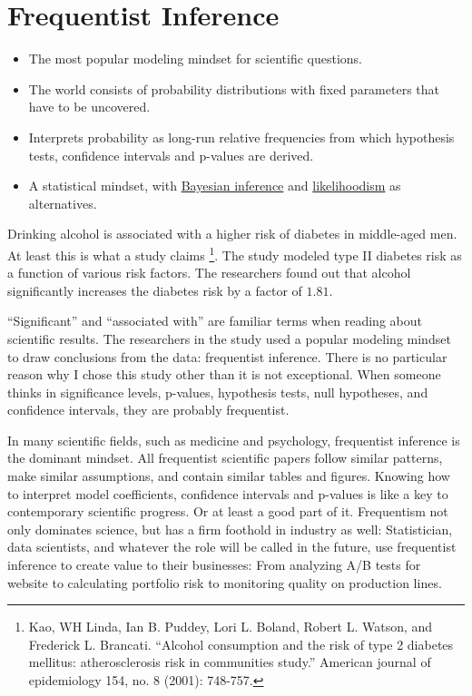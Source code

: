 \documentclass[
  10pt,
]{scrbook}
\providecommand{\tightlist}{%
  \setlength{\itemsep}{0pt}\setlength{\parskip}{0pt}}
\begin{document}
\hypertarget{statistical-inference}{%
\chapter{Frequentist Inference}\label{statistical-inference}}

\begin{itemize}
\tightlist
\item
  The most popular modeling mindset for scientific questions.
\item
  The world consists of probability distributions with fixed parameters that have to be uncovered.
\item
  Interprets probability as long-run relative frequencies from which hypothesis tests, confidence intervals and p-values are derived.
\item
  A statistical mindset, with \protect\hyperlink{bayesian}{Bayesian inference} and \protect\hyperlink{likelihoodism}{likelihoodism} as alternatives.
\end{itemize}

Drinking alcohol is associated with a higher risk of diabetes in middle-aged men.
At least this is what a study claims \footnote{Kao, WH Linda, Ian B. Puddey, Lori L. Boland, Robert L. Watson, and Frederick L. Brancati. ``Alcohol consumption and the risk of type 2 diabetes mellitus: atherosclerosis risk in communities study.'' American journal of epidemiology 154, no. 8 (2001): 748-757.}.
The study modeled type II diabetes risk as a function of various risk factors.
The researchers found out that alcohol significantly increases the diabetes risk by a factor of \(1.81\).

``Significant'' and ``associated with'' are familiar terms when reading about scientific results.
The researchers in the study used a popular modeling mindset to draw conclusions from the data: frequentist inference.
There is no particular reason why I chose this study other than it is not exceptional.
When someone thinks in significance levels, p-values, hypothesis tests, null hypotheses, and confidence intervals, they are probably frequentist.

In many scientific fields, such as medicine and psychology, frequentist inference is the dominant mindset.
All frequentist scientific papers follow similar patterns, make similar assumptions, and contain similar tables and figures.
Knowing how to interpret model coefficients, confidence intervals and p-values is like a key to contemporary scientific progress.
Or at least a good part of it.
Frequentism not only dominates science, but has a firm foothold in industry as well:
Statistician, data scientists, and whatever the role will be called in the future, use frequentist inference to create value to their businesses:
From analyzing A/B tests for website to calculating portfolio risk to monitoring quality on production lines.
\end{document}
